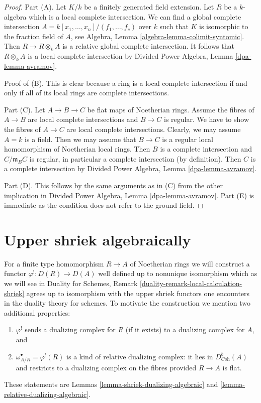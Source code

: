 \begin{proof}
Part (A). Let $K/k$ be a finitely generated field extension.
Let $R$ be a $k$-algebra which is a local complete intersection.
We can find a global complete intersection
$A = k[x_1, \ldots, x_n]/(f_1, \ldots, f_c)$
over $k$ such that $K$ is isomorphic to the fraction field of $A$, see
Algebra, Lemma \ref{algebra-lemma-colimit-syntomic}.
Then $R \to R \otimes_k A$ is a relative global complete intersection.
It follows that $R \otimes_k A$ is a local complete intersection
by Divided Power Algebra, Lemma \ref{dpa-lemma-avramov}.

\medskip\noindent
Proof of (B). This is clear
because a ring is a local complete intersection if and only if all of its
local rings are complete intersections.

\medskip\noindent
Part (C). Let $A \to B \to C$ be flat maps of Noetherian rings.
Assume the fibres of $A \to B$ are local complete intersections
and $B \to C$ is regular. We have to show the fibres of $A \to C$
are local complete intersections. Clearly, we may assume $A = k$ is a field.
Then we may assume that $B \to C$ is a regular local homomorphism
of Noetherian local rings. Then $B$ is a complete intersection and
$C/\mathfrak m_B C$ is regular, in particular a complete intersection
(by definition). Then $C$ is a complete intersection by
Divided Power Algebra, Lemma \ref{dpa-lemma-avramov}.

\medskip\noindent
Part (D). This follows by the same arguments as in (C) from
the other implication in
Divided Power Algebra, Lemma \ref{dpa-lemma-avramov}.
Part (E) is immediate as the condition does not refer to the ground
field.
\end{proof}






\section{Upper shriek algebraically}
\label{section-relative-dualizing-complex-algebraic}

\noindent
For a finite type homomorphism $R \to A$ of Noetherian rings
we will construct a functor $\varphi^! : D(R) \to D(A)$
well defined up to nonunique isomorphism which
as we will see in Duality for Schemes, Remark
\ref{duality-remark-local-calculation-shriek}
agrees up to isomorphism with the upper shriek functors
one encounters in the duality theory for schemes.
To motivate the construction we mention two additional properties:
\begin{enumerate}
\item $\varphi^!$ sends a dualizing complex for $R$ (if it exists)
to a dualizing complex for $A$, and
\item $\omega_{A/R}^\bullet = \varphi^!(R)$ is a kind of
relative dualizing complex: it lies in $D^b_{\textit{Coh}}(A)$ and restricts
to a dualizing complex on the fibres provided $R \to A$ is flat.
\end{enumerate}
These statements are Lemmas \ref{lemma-shriek-dualizing-algebraic} and
\ref{lemma-relative-dualizing-algebraic}.


